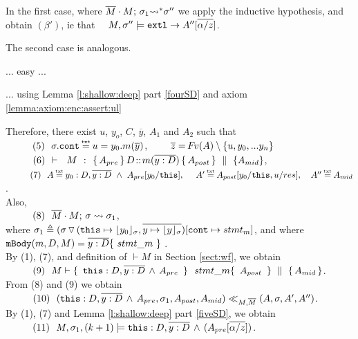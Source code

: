 \begin{description}
In the first case, where $\overline{M}\cdot M;\, {\sigma_1} {\rightsquigarrow^*} \sigma''$ we apply the inductive hypothesis, and obtain $(\beta')$, ie that \ \ $ M, \sigma'' \models \mbox{\normalfont{\texttt{extl}}} \rightarrow A''[\overline{\alpha/z}]$.

 The second case is analogous.
 
  \item[{\sc{combine}}] ... easy ...
  
 \item[{\sc{consequ}}] ... using Lemma \ref{l:shallow:deep} part \ref{fourSD}  and axiom \ref{lemma:axiom:enc:assert:ul}

%
%
\item[{\sc{Call\_Int}}]
 
 Therefore, there exist $u$, $y_o$, $C$, $\overline y$,  $A_1$ and $A_2$ such that \\
 $\SPS (5) \ \ \sigma.\prg{cont}\txteq u=y_0.m(\overline y)$,  \ \ \ \ $\overline z = {\hspace{-1pt}F\hspace{-1pt}}v(A)\setminus \{ u, y_0, ... y_n \}$
\\ 
$\strut \ \ \hspace{0.5cm} \ \  (6) \  \ {\vdash \ \ M\ \ \mathbf{:}\ \  \{\, A_{pre}\, \}\, D\!::\!m(\overline{y:D})\, \{\, A_{post}\, \} \, \,\parallel\,\, \{ A_{mid} \}}$, \\
$\SPS (7) \  \ A \txteq y_0:D ,\overline {y:D}\ \wedge \  A_{pre}[y_0/\prg{this}],\ \  \ \ 
A'  \txteq A_{post}[y_0/\prg{this},u/res],\ \  \  A'' \txteq  A_{mid}$. 
\\
Also, \\
$\strut \ \ \hspace{0.5cm} \ \  (8) \ \ \overline{M}\cdot M;\, {\sigma} \rightsquigarrow \sigma_1$, \\
 where $\sigma_1\triangleq ( \sigma \, {\triangledown}\,  (\mbox{\normalfont{\texttt{this}}}\mapsto {\lfloor y_0 \rfloor_{\sigma}},{\overline{y \mapsto {\lfloor y \rfloor_{\sigma}}}}) [\mbox{\normalfont{\texttt{cont}}}\mapsto stmt_m]$, and where 
  $\prg{mBody}(m,D,M)=\overline{y:D}\{\    stmt\_m\ \}$ .\\
By (1), (7), and definition of $\vdash M$ in Section \ref{sect:wf}, we obtain\\
$\SPS (9) \ \ M \vdash  \quadruple { \ \prg{this}:D,\overline{y:D}\, \wedge\, A_{pre}\  } {\ stmt\_m } {\ A_{post}\ } {A_{mid}}$.\\
From (8) and (9) we obtain  \\
$\strut \ \ \hspace{0.5cm} \ \  (10) \ \ (\mbox{\normalfont{\texttt{this}}}:D,\overline{y:D}\, \wedge\, A_{pre},\sigma_1,A_{post}, A_{mid}) \ll_{M,\overline{M}} (A,\sigma,A', A'')$. 
\\
By (1), (7) and Lemma   \ref{l:shallow:deep} part \ref{fiveSD}, we obtain\\
$\strut \ \ \hspace{0.5cm} \ \  (11) \ \  M,\sigma_1 ,{(k+1)} \models {\mbox{\normalfont{\texttt{this}}}:D,\overline{y:D}\, \wedge\, (A_{pre}[\overline{\alpha/z}])} $.


\end{description}
